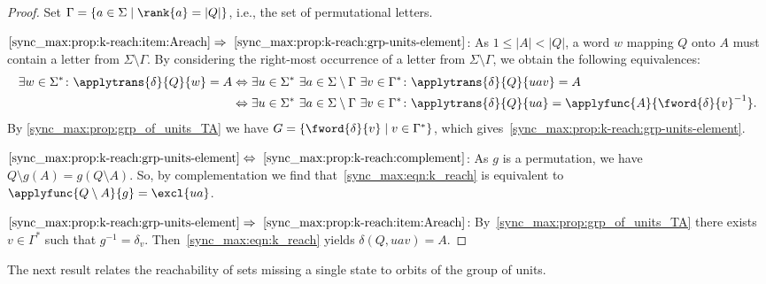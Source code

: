 \begin{proof} Set $\Gamma = \{ a \in \Sigma \mid \rank{a} = |Q| \}$, i.e., the set of permutational letters.
	
$\ref{sync_max:prop:k-reach:item:Areach} \Rightarrow~\ref{sync_max:prop:k-reach:grp-units-element}$: 
	As $1 \le |A| < |Q|$, 	
	a word $w$ mapping $Q$ onto $A$ 
	must contain a letter from $\Sigma \setminus \Gamma$.
	By considering the right-most occurrence of a letter from $\Sigma \setminus \Gamma$,
	we obtain the following equivalences:
	\begin{align*}
		\exists w \in \Sigma^* \colon \applytrans{\delta}{Q}{w} = A 
		& \Leftrightarrow  \exists u \in \Sigma^* \  \exists a \in \Sigma \setminus \Gamma	\  \exists v \in \Gamma^* \colon \applytrans{\delta}{Q}{uav} = A \\
		& \Leftrightarrow  \exists u \in \Sigma^* \  \exists a \in \Sigma \setminus \Gamma	\  \exists v \in \Gamma^* \colon \applytrans{\delta}{Q}{ua} = \applyfunc{A}{\fword{\delta}{v}^{-1}}.
	\end{align*}
	By \cref{sync_max:prop:grp_of_units_TA} 
	we have $G = \{ \fword{\delta}{v} \mid v \in \Gamma^* \}$, which
	gives~\ref{sync_max:prop:k-reach:grp-units-element}.	
	
$\ref{sync_max:prop:k-reach:grp-units-element} \Leftrightarrow~\ref{sync_max:prop:k-reach:complement}$:
As $g$ is a permutation,
we have  $Q \setminus g(A) = g(Q \setminus A)$. So, by complementation we find that~\cref{sync_max:eqn:k_reach} 
is equivalent to $\applyfunc{Q \setminus A}{g} = \excl{ua}$.

$\ref{sync_max:prop:k-reach:grp-units-element} \Rightarrow~\ref{sync_max:prop:k-reach:item:Areach}$:
By~\cref{sync_max:prop:grp_of_units_TA} there exists $v \in \Gamma^*$
such that $g^{-1} = \delta_v$. Then~\cref{sync_max:eqn:k_reach} yields $\delta(Q, uav) = A$.
\end{proof}

The next result relates the reachability of sets missing a single state
to orbits of the group of units.

